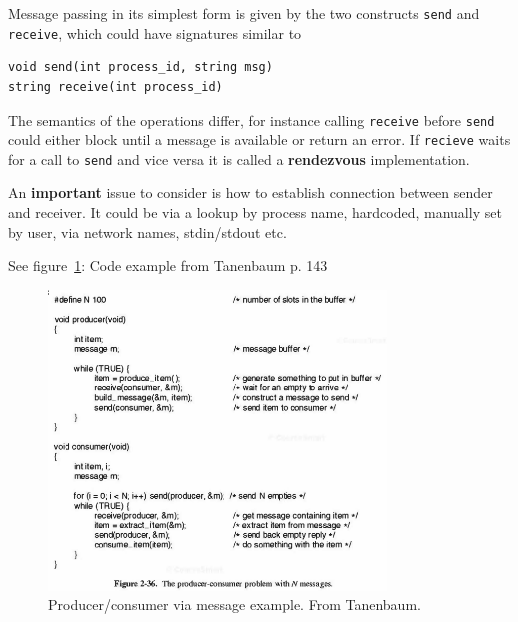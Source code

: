 

Message passing in its simplest form is given by the two constructs \texttt{send} and \texttt{receive}, which could have signatures similar to

\begin{lstlisting}
void send(int process_id, string msg)
string receive(int process_id)
\end{lstlisting}

The semantics of the operations differ, for instance calling \texttt{receive} before \texttt{send} could either block until a message is available or return an error. If \texttt{recieve} waits for a call to \texttt{send} and vice versa it is called a \textbf{rendezvous} implementation.

An \textbf{important} issue to consider is how to establish connection between sender and receiver. It could be via a lookup by process name, hardcoded, manually set by user, via network names, stdin/stdout etc.

See figure~\ref{fig:msg-passing}: Code example from Tanenbaum p. 143
\begin{figure}[h]
  \centering
  \includegraphics[width=0.8\textwidth]{images/message_passing}
  \caption{Producer/consumer via message example. From Tanenbaum.}
  \label{fig:msg-passing}
\end{figure}
